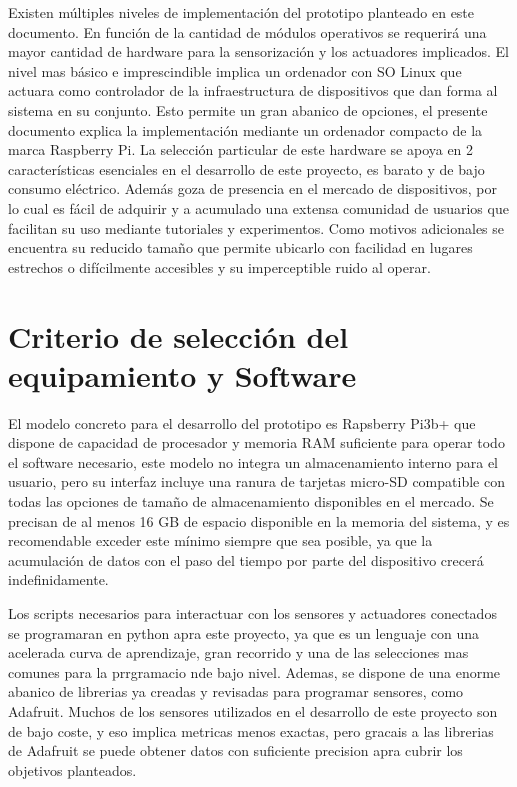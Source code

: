 Existen múltiples niveles de implementación del prototipo planteado en este documento. En función de la cantidad de módulos operativos se requerirá una mayor cantidad de hardware para la sensorización y los actuadores implicados. El nivel mas básico e imprescindible implica un ordenador con SO Linux que actuara como controlador de la infraestructura de dispositivos que dan forma al sistema en su conjunto. Esto permite un gran abanico de opciones, el presente documento explica la implementación mediante un ordenador compacto de la marca Raspberry Pi. La selección particular de este hardware se apoya en 2 características esenciales en el desarrollo de este proyecto, es barato y de bajo consumo eléctrico. Además goza de presencia en el mercado de dispositivos, por lo cual es fácil de adquirir y a acumulado una extensa comunidad de usuarios que facilitan su uso mediante tutoriales y experimentos. Como motivos adicionales se encuentra su reducido tamaño que permite ubicarlo con facilidad en lugares estrechos o difícilmente accesibles y su imperceptible ruido al operar.

\section{Criterio de selección del equipamiento y Software}
\label{makereference1.4}
El modelo concreto para el desarrollo del prototipo es Rapsberry Pi3b+ que dispone de capacidad de procesador y memoria RAM suficiente para operar todo el software necesario, este modelo no integra un almacenamiento interno para el usuario, pero su interfaz incluye una ranura de tarjetas micro-SD compatible con todas las opciones de tamaño de almacenamiento disponibles en el mercado. Se precisan de al menos 16 GB de espacio disponible en la memoria del sistema, y es recomendable exceder este mínimo siempre que sea posible, ya que la acumulación de datos con el paso del tiempo por parte del dispositivo crecerá indefinidamente.

Los scripts necesarios para interactuar con los sensores y actuadores conectados se programaran en python apra este proyecto, ya que es un lenguaje con una acelerada curva de aprendizaje, gran recorrido y una de las selecciones mas comunes para la prrgramacio nde bajo nivel. Ademas, se dispone de una enorme abanico de librerias ya creadas y revisadas para programar sensores, como Adafruit. Muchos de los sensores utilizados en el desarrollo de este proyecto son de bajo coste, y eso implica metricas menos exactas, pero gracais a las librerias de Adafruit se puede obtener datos con suficiente precision apra cubrir los objetivos planteados.

